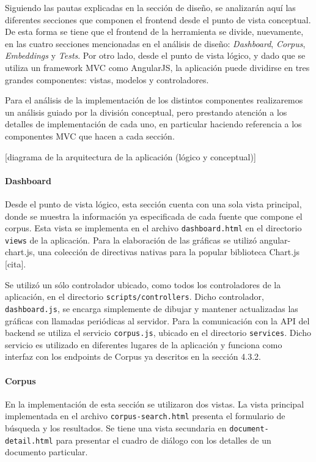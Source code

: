 Siguiendo las pautas explicadas en la sección de diseño, se analizarán aquí las diferentes secciones que
componen el frontend desde el punto de vista conceptual. De esta forma se tiene que el frontend de la
herramienta se divide, nuevamente, en las cuatro secciones mencionadas en el análisis de diseño:
\textit{Dashboard}, \textit{Corpus}, \textit{Embeddings} y \textit{Tests}. Por otro lado, desde el punto
de vista lógico, y dado que se utiliza un framework MVC como AngularJS, la aplicación puede dividirse en
tres grandes componentes: vistas, modelos y controladores.

Para el análisis de la implementación de los distintos componentes realizaremos un análisis guiado por la
división conceptual, pero prestando atención a los detalles de implementación de cada uno, en
particular haciendo referencia a los componentes MVC que hacen a cada sección.

[diagrama de la arquitectura de la aplicación (lógico y conceptual)]

\paragraph{Dashboard}

Desde el punto de vista lógico, esta sección cuenta con una sola vista principal, donde se muestra la
información ya especificada de cada fuente que compone el corpus. Esta vista se implementa en el archivo
\texttt{dashboard.html} en el directorio \texttt{views} de la aplicación. Para la elaboración de las
gráficas se utilizó angular-chart.js, una colección de directivas nativas para la popular biblioteca
Chart.js [cita].

Se utilizó un sólo controlador ubicado, como todos los controladores de la aplicación, en el directorio
\texttt{scripts/controllers}. Dicho controlador, \texttt{dashboard.js}, se encarga simplemente de dibujar
y mantener actualizadas las gráficas con llamadas periódicas al servidor. Para la comunicación con la
API del backend se utiliza el servicio \texttt{corpus.js}, ubicado en el directorio \texttt{services}. Dicho
servicio es utilizado en diferentes lugares de la aplicación y funciona como interfaz con los endpoints
de Corpus ya descritos en la sección 4.3.2.

\paragraph{Corpus}

En la implementación de esta sección se utilizaron dos vistas. La vista principal implementada en el
archivo \texttt{corpus-search.html} presenta el formulario de búsqueda y los resultados. Se tiene una
vista secundaria en \texttt{document-detail.html} para presentar el cuadro de diálogo con los detalles
de un documento particular.

